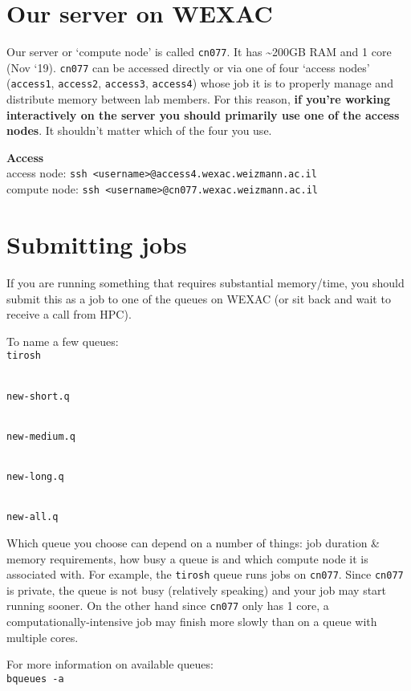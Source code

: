 \documentclass[
]{book}
\begin{document}
\hypertarget{our-server-on-wexac}{%
\section{Our server on WEXAC}\label{our-server-on-wexac}}

Our server or `compute node' is called \texttt{cn077}. It has \textasciitilde200GB RAM and 1 core (Nov `19). \texttt{cn077} can be accessed directly or via one of four `access nodes' (\texttt{access1}, \texttt{access2}, \texttt{access3}, \texttt{access4}) whose job it is to properly manage and distribute memory between lab members. For this reason, \textbf{if you're working interactively on the server you should primarily use one of the access nodes}. It shouldn't matter which of the four you use.

\textbf{Access}\\
access node: \texttt{ssh\ \textless{}username\textgreater{}@access4.wexac.weizmann.ac.il}\\
compute node: \texttt{ssh\ \textless{}username\textgreater{}@cn077.wexac.weizmann.ac.il}

\hypertarget{submitting-jobs}{%
\section{Submitting jobs}\label{submitting-jobs}}

If you are running something that requires substantial memory/time, you should submit this as a job to one of the queues on WEXAC (or sit back and wait to receive a call from HPC).

To name a few queues:\\
\texttt{tirosh}\strut \\
\texttt{new-short.q}\strut \\
\texttt{new-medium.q}\strut \\
\texttt{new-long.q}\strut \\
\texttt{new-all.q}

Which queue you choose can depend on a number of things: job duration \& memory requirements, how busy a queue is and which compute node it is associated with. For example, the \texttt{tirosh} queue runs jobs on \texttt{cn077}. Since \texttt{cn077} is private, the queue is not busy (relatively speaking) and your job may start running sooner. On the other hand since \texttt{cn077} only has 1 core, a computationally-intensive job may finish more slowly than on a queue with multiple cores.

For more information on available queues:\\
\texttt{bqueues\ -a}
\end{document}
